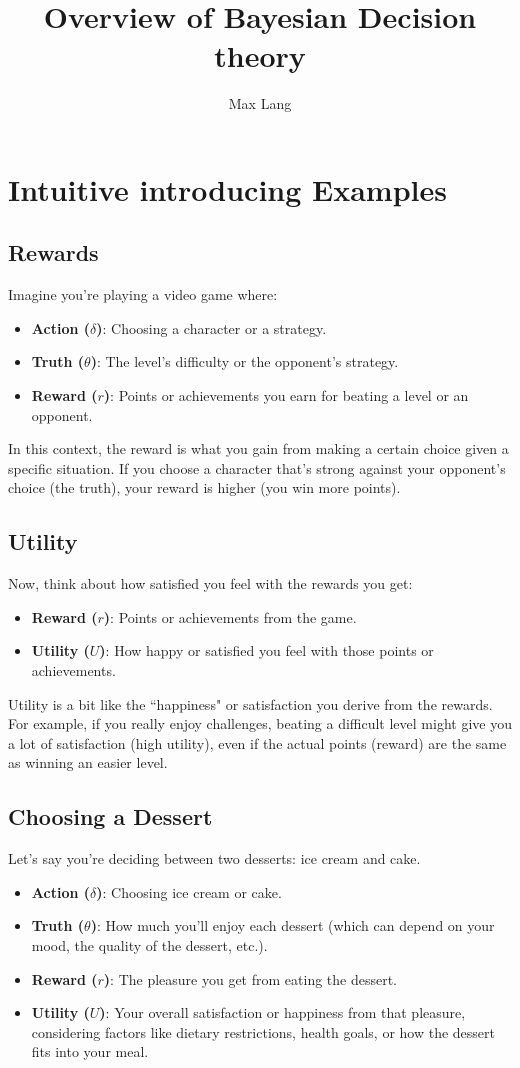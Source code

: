 \documentclass{article}
\title{Overview of Bayesian Decision theory}
\author{Max Lang}
\begin{document}
\section{Intuitive introducing Examples}
\subsection{Rewards}
Imagine you're playing a video game where:
\begin{itemize}
    \item \textbf{Action (\(\delta\))}: Choosing a character or a strategy.
    \item \textbf{Truth (\(\theta\))}: The level's difficulty or the opponent's strategy.
    \item \textbf{Reward (\(r\))}: Points or achievements you earn for beating a level or an opponent.
\end{itemize}

In this context, the reward is what you gain from making a certain choice given a specific situation. If you choose a character that's strong against your opponent's choice (the truth), your reward is higher (you win more points).

\subsection{Utility}
Now, think about how satisfied you feel with the rewards you get:
\begin{itemize}
    \item \textbf{Reward (\(r\))}: Points or achievements from the game.
    \item \textbf{Utility (\(U\))}: How happy or satisfied you feel with those points or achievements.
\end{itemize}

Utility is a bit like the ``happiness" or satisfaction you derive from the rewards. For example, if you really enjoy challenges, beating a difficult level might give you a lot of satisfaction (high utility), even if the actual points (reward) are the same as winning an easier level.

\subsection{Choosing a Dessert}
Let's say you're deciding between two desserts: ice cream and cake.
\begin{itemize}
    \item \textbf{Action (\(\delta\))}: Choosing ice cream or cake.
    \item \textbf{Truth (\(\theta\))}: How much you'll enjoy each dessert (which can depend on your mood, the quality of the dessert, etc.).
    \item \textbf{Reward (\(r\))}: The pleasure you get from eating the dessert.
    \item \textbf{Utility (\(U\))}: Your overall satisfaction or happiness from that pleasure, considering factors like dietary restrictions, health goals, or how the dessert fits into your meal.
\end{itemize}
\end{document}
